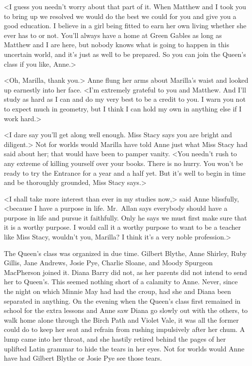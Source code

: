 <I guess you needn't worry about that part of it. When Matthew and I took you to bring up we resolved we would do the best we could for you and give you a good education. I believe in a girl being fitted to earn her own living whether she ever has to or not. You'll always have a home at Green Gables as long as Matthew and I are here, but nobody knows what is going to happen in this uncertain world, and it's just as well to be prepared. So you can join the Queen's class if you like, Anne.>

<Oh, Marilla, thank you.> Anne flung her arms about Marilla's waist and looked up earnestly into her face. <I'm extremely grateful to you and Matthew. And I'll study as hard as I can and do my very best to be a credit to you. I warn you not to expect much in geometry, but I think I can hold my own in anything else if I work hard.>

<I dare say you'll get along well enough. Miss Stacy says you are bright and diligent.> Not for worlds would Marilla have told Anne just what Miss Stacy had said about her; that would have been to pamper vanity. <You needn't rush to any extreme of killing yourself over your books. There is no hurry. You won't be ready to try the Entrance for a year and a half yet. But it's well to begin in time and be thoroughly grounded, Miss Stacy says.>

<I shall take more interest than ever in my studies now,> said Anne blissfully, <because I have a purpose in life. Mr.~Allan says everybody should have a purpose in life and pursue it faithfully. Only he says we must first make sure that it is a worthy purpose. I would call it a worthy purpose to want to be a teacher like Miss Stacy, wouldn't you, Marilla? I think it's a very noble profession.>

The Queen's class was organized in due time. Gilbert Blythe, Anne Shirley, Ruby Gillis, Jane Andrews, Josie Pye, Charlie Sloane, and Moody Spurgeon MacPherson joined it. Diana Barry did not, as her parents did not intend to send her to Queen's. This seemed nothing short of a calamity to Anne. Never, since the night on which Minnie May had had the croup, had she and Diana been separated in anything. On the evening when the Queen's class first remained in school for the extra lessons and Anne saw Diana go slowly out with the others, to walk home alone through the Birch Path and Violet Vale, it was all the former could do to keep her seat and refrain from rushing impulsively after her chum. A lump came into her throat, and she hastily retired behind the pages of her uplifted Latin grammar to hide the tears in her eyes. Not for worlds would Anne have had Gilbert Blythe or Josie Pye see those tears.

